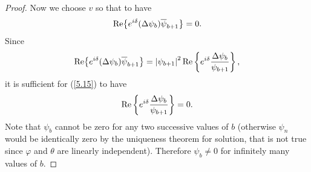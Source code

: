 \documentclass[11pt]{article}
\numberwithin{equation}{section}
\begin{document}
\begin{proof}
Now we choose $v$ so that to have%
\begin{equation}
{\rm Re}\big\{e^{i\delta }(\Delta \psi _{b})\overline{\psi }_{b+1}\big\}=0.
\label{5.15}
\end{equation}%
Since%
\[
{\rm Re}\big\{e^{i\delta }(\Delta \psi _{b})\overline{\psi }_{b+1}\big\}=\left\vert
\psi _{b+1}\right\vert ^{2}{\rm Re}\left\{ e^{i\delta }\frac{\Delta \psi
_{b}}{\psi _{b+1}}\right\} ,
\]%
it is suf\/f\/icient for (\ref{5.15}) to have%
\begin{equation}
{\rm Re}\left\{ e^{i\delta }\frac{\Delta \psi _{b}}{\psi _{b+1}}\right\} =0.
\label{5.16}
\end{equation}%
Note that $\psi _{b}$ cannot be zero for any two successive values of $b$
(otherwise $\psi _{n}$ would be identically zero by the uniqueness theorem
for solution, that is not true since $\varphi $ and $\theta $ are linearly
independent). Therefore $\psi _{b}\neq 0$ for inf\/initely many values of $b.$


\end{proof}
\end{document}
